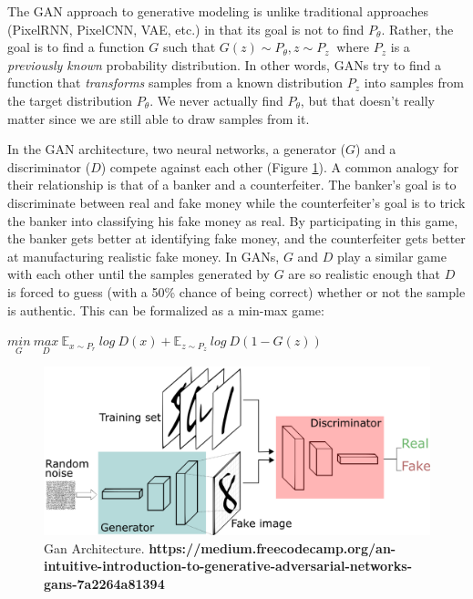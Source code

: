 
The GAN approach to generative modeling is unlike traditional approaches (PixelRNN, PixelCNN, VAE, etc.) in that its goal is not to find $P_\theta$. Rather, the goal is to find a function $G$ such that $G(z) \sim P_\theta, z \sim P_z~$ where $P_z$ is a \textit{previously known} probability distribution. In other words, GANs try to find a function that \textit{transforms} samples from a known distribution $P_z$ into samples from the target distribution $P_\theta$. We never actually find $P_\theta$, but that doesn't really matter since we are still able to draw samples from it. 

In the GAN architecture, two neural networks, a generator ($G$) and a discriminator ($D$) compete against each other (Figure \ref{fig:gan}). A common analogy for their relationship is that of a banker and a counterfeiter. The banker's goal is to discriminate between real and fake money while the counterfeiter's goal is to trick the banker into classifying his fake money as real. By participating in this game, the banker gets better at identifying fake money, and the counterfeiter gets better at manufacturing realistic fake money. In GANs, $G$ and $D$ play a similar game with each other until the samples generated by $G$ are so realistic enough that $D$ is forced to guess (with a 50\% chance of being correct) whether or not the sample is authentic. This can be formalized as a min-max game:

\begin{center}
	$\underset{G}{min}~\underset{D}{max}~\mathbb{E}_{x \sim P_r}~log~D(x) + \mathbb{E}_{z \sim P_z}~log~D(1-G(z))$
\end{center}

\begin{figure}[h!]
	\centering
	\includegraphics[width=\linewidth]{media/gan.png}
	\caption{Gan Architecture.  \textbf{https://medium.freecodecamp.org/an-intuitive-introduction-to-generative-adversarial-networks-gans-7a2264a81394}}
	\label{fig:gan}
\end{figure}

